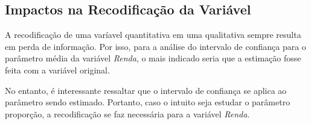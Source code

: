\subsection{Impactos na Recodificação da Variável}
	
	A recodificação de uma varíavel quantitativa em uma qualitativa sempre
	resulta em perda de informação. Por isso, para a análise do intervalo de
	confiança para o parâmetro média da variável \textit{Renda}, o mais
	indicado seria que a estimação fosse feita com a variável original.

	No entanto, é interessante ressaltar que o intervalo de confiança se
	aplica ao parâmetro sendo estimado. Portanto, caso o intuito seja
	estudar o parâmetro proporção, a recodificação se faz necessária para a
	variável \textit{Renda}.

